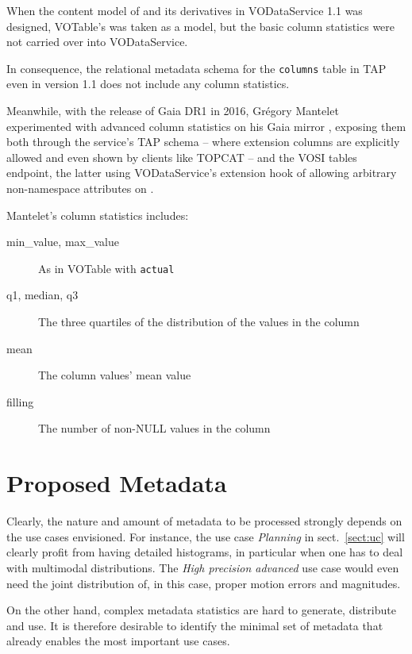 \documentclass[11pt,a4paper]{ivoa}
\begin{document}
When the content model of  and its derivatives in
VODataService 1.1 \citep{2010ivoa.spec.1202P} was designed, VOTable's
 was taken as a model, but the basic column statistics
were not carried over into VODataService.

In consequence, the relational metadata schema for the
\verb|columns| table in TAP \citep{2019ivoa.spec.0927D} even in
version 1.1 does not include any column statistics.

Meanwhile, with the release of Gaia DR1 in 2016, Gr\'egory Mantelet
experimented with advanced column statistics on his Gaia mirror
\citep{data:arigaia}, exposing them both through the service's TAP
schema -- where extension columns are explicitly allowed and even shown
by clients like TOPCAT \citep{2005ASPC..347...29T} -- and the VOSI tables
endpoint, the latter using VODataService's extension hook of allowing
arbitrary non-namespace attributes on .

Mantelet's column statistics includes:

\begin{description}
\item[min\_value, max\_value] As in VOTable with  \verb|actual|
\item[q1, median, q3] The three quartiles of the distribution of the
values in the column
\item[mean] The column values' mean value
\item[filling] The number of non-NULL values in the column
\end{description}


\section{Proposed Metadata}
\label{sect:metadata}

Clearly, the nature and amount of metadata to be processed strongly
depends on the use cases envisioned.  For instance, the use case
\emph{Planning} in sect.~\ref{sect:uc} will clearly profit from having
detailed histograms, in particular when one has to deal with multimodal
distributions.  The \emph{High precision advanced} use case would even
need the joint distribution of, in this case, proper motion errors and
magnitudes.

On the other hand, complex metadata statistics are hard to generate,
distribute and use.  It is therefore desirable to identify the
minimal set of metadata that already enables the most important use
cases.
\end{document}
